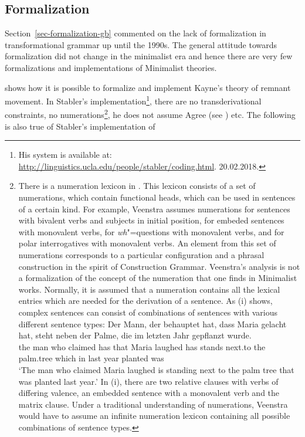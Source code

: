 \subsection{Formalization}
\label{sec-formalization-minimalism}

\addlines[2]
Section~\ref{sec-formalization-gb} commented on the lack of formalization in transformational
grammar up until the 1990s. The general attitude towards formalization did not change in the
minimalist era and hence there are very few formalizations and implementations of Minimalist theories.

\citet{Stabler2001a} shows how it is possible to formalize and implement Kayne's theory of remnant movement. In
Stabler's implementation\footnote{%
	His system is available at:
\url{http://linguistics.ucla.edu/people/stabler/coding.html}. 20.02.2018.
}, there are no transderivational constraints, no numerations\footnote{%
	There is a numeration lexicon in \citet[Chapter~9]{Veenstra98a}. This lexicon consists of a set of numerations, which contain functional
	heads, which can be used in sentences of a certain kind. For example, Veenstra assumes numerations for sentences with bivalent verbs
	and subjects in initial position, for embeded sentences with monovalent verbs, for \emph{wh}"=questions with monovalent verbs, and
	for polar interrogatives with monovalent verbs. An element from this set of numerations corresponds to a particular configuration and a
	phrasal construction in the spirit of Construction Grammar\indexcxg. Veenstra's analysis is not a formalization of the concept of the numeration
	that one finds in Minimalist works. Normally, it is assumed that a numeration contains all the lexical entries which are needed for the derivation
	of a sentence. As (i) shows, complex sentences can consist of combinations of sentences with
        various different sentence types: 
\ea
\gll Der Mann, der behauptet hat, dass Maria gelacht hat, steht neben der Palme, die im letzten Jahr gepflanzt wurde.\\
     the man who claimed has that Maria laughed has stands next.to the palm.tree which in last year planted was\\
\glt `The man who claimed Maria laughed is standing next to the palm tree that was planted last year.'
\z
In (i), there are two relative clauses with verbs of differing valence, an embedded sentence with a monovalent verb and the matrix clause.
Under a traditional understanding of numerations, Veenstra would have to assume an infinite numeration lexicon containing all possible
combinations of sentence types.
}, he does not assume Agree (see \citealp[]{Fong2014a}) etc. The following is also true of Stabler's implementation of 
